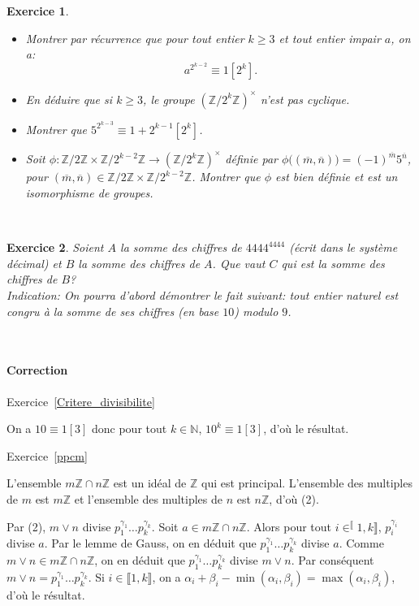 \documentclass[11pt,a4paper]{article}
\newtheorem{ex}{Exercice}
\newcommand{\N}{\mathbb{N}}
\newcommand{\Z}{\mathbb{Z}}
\begin{document}
\begin{ex}\label{ordre_Z_2KZ}\
\begin{itemize}
\item[$1.$] Montrer par récurrence que pour tout entier $k \geq  3$ et tout entier impair $a$, on a:
$$  a^{2^{k-2}}\equiv 1 [2^k] .  $$
\item[$2.$] En déduire que si $k \geq  3$, le groupe $(\mathbb{Z}/2^k \mathbb{Z})^{\times}$ n'est pas cyclique.


\item[$3.$] Montrer que $5^{2^{k-3}}\equiv 1+2^{k-1}[2^k]$.

\item[$4.$] Soit $\phi:\Z/2\Z\times \Z/2^{k-2}\Z\rightarrow (\Z/2^k\Z)^\times$ définie par $\phi\big((\overline{m},\overline{n})\big)=(-1)^{\overline{m}} 5^{\overline{n}}$, pour $(\overline{m},\overline{n})\in \Z/2\Z\times \Z/2^{k-2}\Z$. Montrer que $\phi$ est bien définie et est un isomorphisme de groupes.

\end{itemize}
\end{ex}


\

\begin{ex}\label{Somme_chiffres}
Soient $A$ la somme des chiffres de $4444^{4444}$ (écrit dans le système décimal) et $B$ la somme des chiffres de $A$. Que vaut $C$ qui est la somme des chiffres de $B$?\\
\textit{Indication: On pourra d'abord démontrer le fait suivant: tout entier naturel  est congru à la somme de ses chiffres (en base $10$) modulo $9$.}

\end{ex}

\

\paragraph{Correction}


Exercice~\ref{Critere_divisibilite}

On a $10\equiv 1[3]$ donc pour tout $k\in \N$, $10^k\equiv 1[3]$, d'où le résultat.



Exercice~\ref{ppcm}

L'ensemble $m\Z\cap n\Z$ est un idéal de $\Z$ qui est principal. L'ensemble des multiples de $m$ est $m\Z$ et l'ensemble des multiples de $n$ est $n\Z$, d'où (2).

Par (2), $m\vee n$ divise $p_1^{\gamma_1}\ldots p_k^{\gamma_k}$. Soit $a\in m\Z\cap n\Z$. Alors  pour tout $i\in^\llbracket 1,k\rrbracket$, $p_i^{\gamma_i}$ divise $a$. Par le lemme de Gauss, on en déduit que $p_1^{\gamma_1} \ldots p_k^{\gamma_k}$ divise $a$. Comme $m\vee n\in m\Z\cap n\Z$, on en déduit que $p_1^{\gamma_1} \ldots p_k^{\gamma_k}$ divise $m\vee n$.  Par conséquent $m\vee n=p_1^{\gamma_1}\ldots p_k^{\gamma_k}$. Si $i\in \llbracket 1,k\rrbracket$, on a $\alpha_i+\beta_i-\min(\alpha_i,\beta_i)=\max(\alpha_i,\beta_i)$, d'où le résultat.
\end{document}
